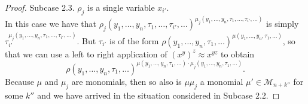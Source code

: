 \documentclass[eqnor,reqno]{amsart}
\theoremstyle{plain}
\theoremstyle{definition}
\newcommand{\Irr}{\operatorname{Irr}}
\newcommand{\HSI}{\textsf{HSI}}
\begin{document}
\begin{proof}
Subcase 2.3.  $\rho_j$ is a single variable $x_{i'}$.\\
In this case we have that $\rho_j(y_1,\dots,y_n,\tau_1,\dots,\tau_{i'},\dots)^{\mu_j(y_1,\dots,y_n,\tau_1,\dots,\tau_{i'},\dots)}$ 
is simply $\tau_{i'}^{\mu_j(y_1,\dots,y_n,\tau_1,\dots,\tau_{i'},\dots)}$.  
But $\tau_{i'}$ is of the form $\rho(y_1,\dots,y_n,\tau_1,\dots)^{\mu(y_1,\dots,y_n,\tau_1,\dots)}$, so that we can use a left to right application of $(x^y)^z\approx x^{yz}$ to obtain 
\[
\rho(y_1,\dots,y_n,\tau_1,\dots)^{\mu(y_1,\dots,y_n,\tau_1,\dots)\cdot \mu_j(y_1,\dots,y_n,\tau_1,\dots)}.
\]  
Because $\mu$ and $\mu_j$ are monomials, then so also is $\mu\mu_j$ a monomial $\mu'\in \mathcal{M}_{n+k''}$ for some $k''$ and we have arrived in the situation considered in Subcase 2.2.
%
%
%
\end{proof}
\end{document}
